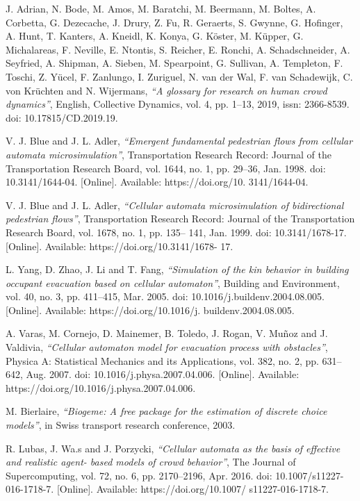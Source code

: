 \documentclass{standalone}
\begin{document}
\begin{thebibliography}{99}
J. Adrian, N. Bode, M. Amos, M. Baratchi, M. Beermann, M. Boltes, A. Corbetta, G. Dezecache, J. Drury, Z. Fu, R. Geraerts, S. Gwynne, G. Hofinger, A. Hunt, T. Kanters, A. Kneidl, K. Konya, G. Köster, M. Küpper, G. Michalareas, F. Neville, E. Ntontis, S. Reicher, E. Ronchi, A. Schadschneider, A. Seyfried, A. Shipman, A. Sieben, M. Spearpoint, G. Sullivan, A. Templeton, F. Toschi, Z. Yücel, F. Zanlungo, I. Zuriguel, N. van der Wal, F. van Schadewijk, C. von Krüchten and N. Wijermans, 
  \textit{“A glossary for research on human crowd dynamics”}, 
  English, Collective Dynamics, 
  vol. 4, pp. 1–13, 2019, 
  issn: 2366-8539. 
  doi: 10.17815/CD.2019.19.


V. J. Blue and J. L. Adler, 
  \textit{“Emergent fundamental pedestrian flows from cellular automata microsimulation”}, 
  Transportation Research Record: Journal of the Transportation Research Board, vol. 1644, no. 1, pp. 29–36, 
  Jan. 1998. 
  doi: 10.3141/1644-04. 
  [Online]. Available: https://doi.org/10. 3141/1644-04.

V. J. Blue and J. L. Adler, 
  \textit{“Cellular automata microsimulation of bidirectional pedestrian flows”}, 
  Transportation Research Record: Journal of the Transportation Research Board, vol. 1678, no. 1, pp. 135– 141, 
  Jan. 1999. 
  doi: 10.3141/1678-17. 
  [Online]. Available: https://doi.org/10.3141/1678- 17.

L. Yang, D. Zhao, J. Li and T. Fang,
  \textit{“Simulation of the kin behavior in building occupant evacuation based on cellular automaton”}, 
Building and Environment, vol. 40, no. 3, pp. 411–415, 
Mar. 2005. 
doi: 10.1016/j.buildenv.2004.08.005. 
[Online]. Available: https://doi.org/10.1016/j. buildenv.2004.08.005.

A. Varas, M. Cornejo, D. Mainemer, B. Toledo, J. Rogan, V. Muñoz and J. Valdivia, 
  \textit{“Cellular automaton model for evacuation process with obstacles”}, 
Physica A: Statistical Mechanics and its Applications, vol. 382, no. 2, pp. 631–642, 
Aug. 2007. 
doi: 10.1016/j.physa.2007.04.006. 
[Online]. Available: https://doi.org/10.1016/j.physa.2007.04.006.

M. Bierlaire,
  \textit{“Biogeme: A free package for the estimation of discrete choice models”}, 
in Swiss transport research conference, 
2003.

R. Lubas, J. Wa.s and J. Porzycki,
  \textit{“Cellular automata as the basis of effective and realistic agent- based models of crowd behavior”}, 
The Journal of Supercomputing, vol. 72, no. 6, pp. 2170–2196, 
Apr. 2016. 
doi: 10.1007/s11227-016-1718-7. 
[Online]. Available: https://doi.org/10.1007/ s11227-016-1718-7.




\end{thebibliography}
\end{document}
